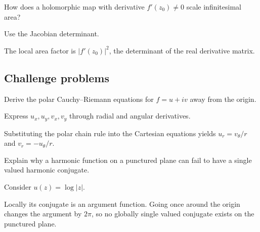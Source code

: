\begin{exercise}\label{exr:iv02-expand-14}
How does a holomorphic map with derivative \(f'(z_0)\ne0\) scale infinitesimal area?
\end{exercise}
\begin{hint}
Use the Jacobian determinant.
\end{hint}
\begin{solution}
The local area factor is \(|f'(z_0)|^2\), the determinant of the real derivative matrix.
\end{solution}

\subsection*{Challenge problems}

\begin{exercise}\label{exr:iv02-expand-15}
Derive the polar Cauchy--Riemann equations for \(f=u+iv\) away from the origin.
\end{exercise}
\begin{hint}
Express \(u_x,u_y,v_x,v_y\) through radial and angular derivatives.
\end{hint}
\begin{solution}
Substituting the polar chain rule into the Cartesian equations yields \(u_r=v_\theta/r\) and \(v_r=-u_\theta/r\).
\end{solution}

\begin{exercise}\label{exr:iv02-expand-16}
Explain why a harmonic function on a punctured plane can fail to have a single valued harmonic conjugate.
\end{exercise}
\begin{hint}
Consider \(u(z)=\log|z|\).
\end{hint}
\begin{solution}
Locally its conjugate is an argument function. Going once around the origin changes the argument by \(2\pi\), so no globally single valued conjugate exists on the punctured plane.
\end{solution}

